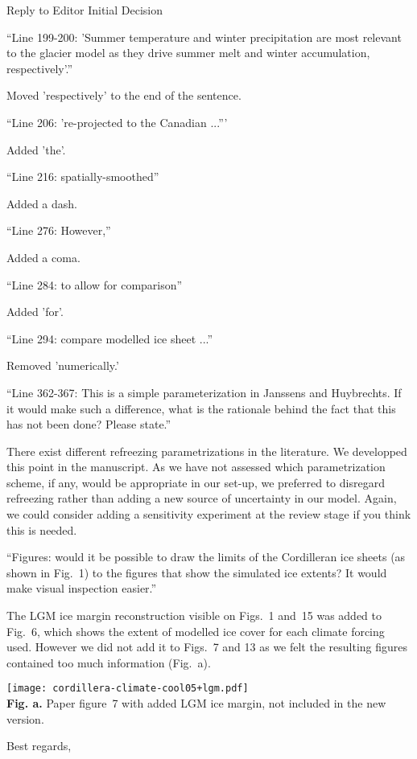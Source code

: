 \documentclass{letter}
\newcommand{\rev}[0]{\color{blue!50!black}\it}
\newcommand{\revpoint}[1]{{\rev\item``#1''}}
\begin{document}
\begin{letter}{Reply to Editor Initial Decision}
\begin{itemize}
\revpoint{Line 199-200: 'Summer temperature and winter precipitation are most relevant to the glacier model as they drive summer melt and winter accumulation, respectively'.}

Moved 'respectively' to the end of the sentence.

\revpoint{Line 206: 're-projected to the Canadian ...'}

Added 'the'.

\revpoint{Line 216: spatially-smoothed}

Added a dash.

\revpoint{Line 276: However,}

Added a coma.

\revpoint{Line 284: to allow for comparison}

Added 'for'.

\revpoint{Line 294: compare modelled ice sheet ...}

Removed 'numerically.'

\revpoint{Line 362-367: This is a simple parameterization in Janssens and Huybrechts. If it would make such a difference, what is the rationale behind the fact that this has not been done? Please state.}

There exist different refreezing parametrizations in the literature. We developped this point in the manuscript. As we have not assessed which parametrization scheme, if any, would be appropriate in our set-up, we preferred to disregard refreezing rather than adding a new source of uncertainty in our model. Again, we could consider adding a sensitivity experiment at the review stage if you think this is needed.

\revpoint{Figures: would it be possible to draw the limits of the Cordilleran ice sheets (as shown in Fig.~1) to the figures that show the simulated ice extents? It would make visual inspection easier.}

The LGM ice margin reconstruction visible on Figs.~1 and~15 was added to Fig.~6, which shows the extent of modelled ice cover for each climate forcing used. However we did not add it to Figs.~7 and 13 as we felt the resulting figures contained too much information (Fig.~a).

\end{itemize}

\begin{center}
	\texttt{[image: cordillera-climate-cool05+lgm.pdf]}\\
	\textbf{Fig. a.} Paper figure~7 with added LGM ice margin, not included in the new version.
\end{center}


\closing{Best regards,}

\end{letter}
\end{document}
